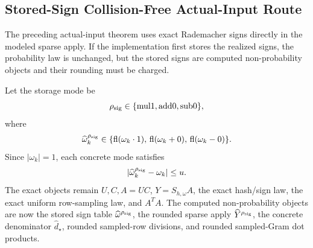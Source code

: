 \documentclass[11pt]{article}
\newcommand{\fl}{\operatorname{fl}}
\theoremstyle{remark}
\begin{document}
\subsection*{Stored-Sign Collision-Free Actual-Input Route}

The preceding actual-input theorem uses exact Rademacher signs directly in the
modeled sparse apply.  If the implementation first stores the realized signs,
the probability law is unchanged, but the stored signs are computed
non-probability objects and their rounding must be charged.

Let the storage mode be
\[
  \rho_{\rm sig}\in\{\mathrm{mul1},\mathrm{add0},\mathrm{sub0}\},
\]
where
\[
  \widehat\omega_k^{\rho_{\rm sig}}
  \in
  \{\fl(\omega_k\cdot1),\,\fl(\omega_k+0),\,\fl(\omega_k-0)\}.
\]
Since \(|\omega_k|=1\), each concrete mode satisfies
\[
  |\widehat\omega_k^{\rho_{\rm sig}}-\omega_k|\le u .
\]
The exact objects remain \(U,C,A=UC\), \(Y=S_{h,\omega}A\), the exact
hash/sign law, the exact uniform row-sampling law, and \(A^TA\).  The
computed non-probability objects are now the stored sign table
\(\widehat\omega^{\rho_{\rm sig}}\), the rounded sparse apply
\(\widehat Y^{\rho_{\rm sig}}\), the concrete denominator
\(\widehat d_\star\), rounded sampled-row divisions, and rounded
sampled-Gram dot products.
\end{document}
